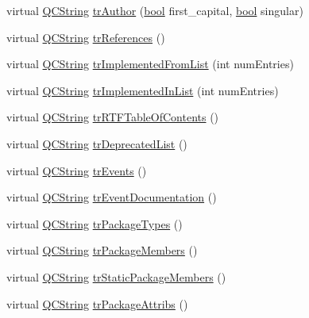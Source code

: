 \begin{DoxyCompactItemize}
\item 
virtual \hyperlink{class_q_c_string}{Q\+C\+String} \hyperlink{class_translator_serbian_cyrillic_a702ebd41ff43cba4154a980781c43eea}{tr\+Author} (\hyperlink{qglobal_8h_a1062901a7428fdd9c7f180f5e01ea056}{bool} first\+\_\+capital, \hyperlink{qglobal_8h_a1062901a7428fdd9c7f180f5e01ea056}{bool} singular)
\item 
virtual \hyperlink{class_q_c_string}{Q\+C\+String} \hyperlink{class_translator_serbian_cyrillic_af031ca3bda559092a82830b048761fc4}{tr\+References} ()
\item 
virtual \hyperlink{class_q_c_string}{Q\+C\+String} \hyperlink{class_translator_serbian_cyrillic_a993e76a71b8379cf8ea8dfdd3cd33ff8}{tr\+Implemented\+From\+List} (int num\+Entries)
\item 
virtual \hyperlink{class_q_c_string}{Q\+C\+String} \hyperlink{class_translator_serbian_cyrillic_a3caf4e16c2280541c5bc5d512fa6ae58}{tr\+Implemented\+In\+List} (int num\+Entries)
\item 
virtual \hyperlink{class_q_c_string}{Q\+C\+String} \hyperlink{class_translator_serbian_cyrillic_a2f31d5298e5c2698b083c86a49d0b411}{tr\+R\+T\+F\+Table\+Of\+Contents} ()
\item 
virtual \hyperlink{class_q_c_string}{Q\+C\+String} \hyperlink{class_translator_serbian_cyrillic_a43456ebb666ada43f0c69067c2bef5fe}{tr\+Deprecated\+List} ()
\item 
virtual \hyperlink{class_q_c_string}{Q\+C\+String} \hyperlink{class_translator_serbian_cyrillic_a44fe734c8aebeab6c68c5bdd36e379c0}{tr\+Events} ()
\item 
virtual \hyperlink{class_q_c_string}{Q\+C\+String} \hyperlink{class_translator_serbian_cyrillic_a091f20241d66086253369101262fa258}{tr\+Event\+Documentation} ()
\item 
virtual \hyperlink{class_q_c_string}{Q\+C\+String} \hyperlink{class_translator_serbian_cyrillic_ac216246c80397c7bf3b492d920ff1d0a}{tr\+Package\+Types} ()
\item 
virtual \hyperlink{class_q_c_string}{Q\+C\+String} \hyperlink{class_translator_serbian_cyrillic_abd2f75a8de502602ea5fee2d913c7ef7}{tr\+Package\+Members} ()
\item 
virtual \hyperlink{class_q_c_string}{Q\+C\+String} \hyperlink{class_translator_serbian_cyrillic_acb67cc91c86ad043ab16647054580c4e}{tr\+Static\+Package\+Members} ()
\item 
virtual \hyperlink{class_q_c_string}{Q\+C\+String} \hyperlink{class_translator_serbian_cyrillic_acb41c128e86a14c89eaec67d289f98d6}{tr\+Package\+Attribs} ()

\end{DoxyCompactItemize}
